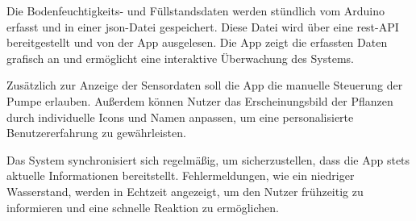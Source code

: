 Die Bodenfeuchtigkeits- und Füllstandsdaten werden stündlich vom Arduino erfasst und in einer \ac{json}-Datei gespeichert. Diese Datei wird über eine \ac{rest}-API bereitgestellt und von der App ausgelesen. Die App zeigt die erfassten Daten grafisch an und ermöglicht eine interaktive Überwachung des Systems.

Zusätzlich zur Anzeige der Sensordaten soll die App die manuelle Steuerung der Pumpe erlauben. Außerdem können Nutzer das Erscheinungsbild der Pflanzen durch individuelle Icons und Namen anpassen, um eine personalisierte Benutzererfahrung zu gewährleisten.

Das System synchronisiert sich regelmäßig, um sicherzustellen, dass die App stets aktuelle Informationen bereitstellt. Fehlermeldungen, wie ein niedriger Wasserstand, werden in Echtzeit angezeigt, um den Nutzer frühzeitig zu informieren und eine schnelle Reaktion zu ermöglichen.


